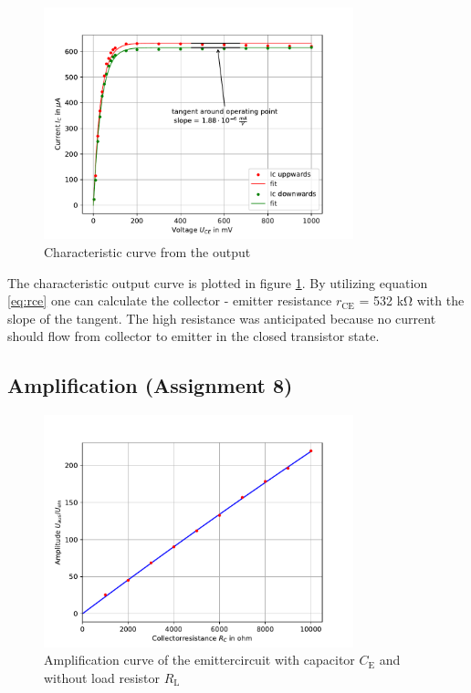 \documentclass[11pt, a4paper]{article}
\begin{document}
\begin{figure}[h]
    \centering
    \includegraphics[width=0.8\textwidth]{plots/Ausgangskennlinie.pdf}
    \caption{Characteristic curve from the output}
    \label{fig:Outcur}
\end{figure}
The characteristic output curve is plotted in figure \ref{fig:Outcur}. By utilizing equation \ref{eq:rce} one can calculate the collector - emitter resistance $r_{\text{CE}}$ = 532 \si{\kilo\ohm} with the slope of the tangent.
The high resistance was anticipated because no current should flow from collector to emitter in the closed transistor state.
\subsection{Amplification (Assignment 8)}
\begin{figure}[h]
    \centering
    \includegraphics[width=0.8\textwidth]{plots/RC1.pdf}
    \caption{Amplification curve of the emittercircuit with capacitor $C_{\text{E}}$ and without load resistor $R_{\text{L}}$}
    \label{fig:RC1}
\end{figure}
\end{document}
